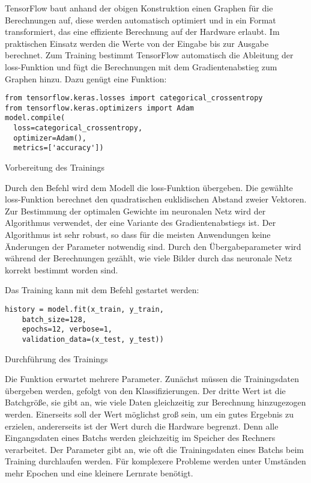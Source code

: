TensorFlow baut anhand der obigen Konstruktion einen Graphen für die Berechnungen auf, diese werden automatisch optimiert und in ein Format transformiert, das eine effiziente Berechnung auf der Hardware erlaubt. Im praktischen Einsatz werden die Werte von der Eingabe bis zur Ausgabe berechnet. Zum Training bestimmt TensorFlow automatisch die Ableitung der loss-Funktion und fügt die Berechnungen mit dem Gradientenabstieg zum Graphen hinzu. Dazu genügt eine Funktion:

\begin{code}
    \begin{lstlisting}[numbers=none]
from tensorflow.keras.losses import categorical_crossentropy
from tensorflow.keras.optimizers import Adam
model.compile(
  loss=categorical_crossentropy,
  optimizer=Adam(),
  metrics=['accuracy'])
\end{lstlisting}

\caption{Vorbereitung des Trainings}
\end{code}


Durch den Befehl wird dem Modell die loss-Funktion  übergeben. Die gewählte loss-Funktion berechnet den quadratischen euklidischen Abstand zweier Vektoren. Zur Bestimmung der optimalen Gewichte im neuronalen Netz wird der Algorithmus  verwendet, der eine  Variante des Gradientenabstiegs ist. Der Algorithmus ist sehr robust, so dass für die meisten Anwendungen keine Änderungen der Parameter notwendig sind. Durch den Übergabeparameter  wird während der Berechnungen  gezählt, wie viele Bilder durch das neuronale Netz korrekt bestimmt worden sind.


\bigskip

Das Training kann mit dem Befehl  gestartet werden:

\begin{code}
    \begin{lstlisting}[numbers=none]
history = model.fit(x_train, y_train,
	batch_size=128,
	epochs=12, verbose=1,
	validation_data=(x_test, y_test))
\end{lstlisting}

\caption{Durchführung des Trainings}
\end{code}


Die Funktion erwartet mehrere Parameter. Zunächst müssen die Trainingsdaten übergeben werden, gefolgt von den Klassifizierungen. Der dritte Wert ist die Batchgröße, sie gibt an, wie viele Daten gleichzeitig zur Berechnung hinzugezogen werden. Einerseits soll der Wert möglichst groß sein, um ein gutes Ergebnis zu erzielen, andererseits ist der Wert durch die Hardware begrenzt. Denn alle Eingangsdaten eines Batchs werden gleichzeitig im Speicher  des Rechners verarbeitet. Der Parameter  gibt an, wie oft die Trainingsdaten eines Batchs beim Training durchlaufen werden. Für komplexere Probleme werden unter Umständen mehr Epochen und eine kleinere Lernrate benötigt.

